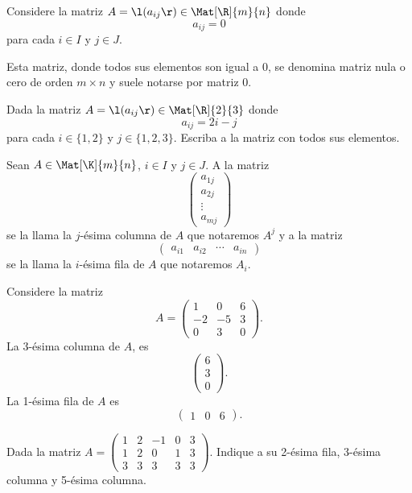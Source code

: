 \documentclass[compacto,10pt]{pubciencias-notas}
\begin{document}
\begin{ejem} \hspace{0pt} Considere la matriz $A = \l(a_{ij}\r)\in\Mat[\R]{m}{n}$ donde
\[
    a_{ij} = 0
\]
para cada $i\in I$ y $j\in J$. 

Esta matriz, donde todos sus elementos son igual a 0, se denomina matriz nula o cero de orden $m\times n$ y suele notarse por matriz $0$.  
    
\end{ejem}

\begin{ejer}\hspace{0pt} Dada la matriz $A = \l(a_{ij}\r)\in\Mat[\R]{2}{3}$ donde
\[
    a_{ij} = 2i - j
\]
para cada $i\in\{1,2\}$ y $j\in\{1,2,3\}$. Escriba a la matriz con todos sus elementos.
\end{ejer}

\begin{defi}
    Sean $A\in\Mat[\K]{m}{n}$, $i\in I$ y $j\in J$. A la matriz
    \[
        \begin{pmatrix}
        a_{1j} \\ 
        a_{2j} \\ 
        \vdots \\ 
        a_{mj} 
        \end{pmatrix}
    \]
    se la llama la $j$-ésima columna de $A$ que notaremos $A^j$ y a la matriz
    \[
        \begin{pmatrix}
        a_{i1}& a_{i2}&\cdots& a_{in}
        \end{pmatrix}
    \]
    se la llama la $i$-ésima fila de $A$ que notaremos $A_i$.
\end{defi}

\begin{ejem}
Considere la matriz
\[
    A = \begin{pmatrix}1&0&6\\-2&-5&3\\0&3&0\end{pmatrix}.
\]
La 3-ésima columna de $A$, es
\[
    \begin{pmatrix}6\\3\\0\end{pmatrix}.
\]
La 1-ésima fila de $A$ es
\[
    \begin{pmatrix}1&0&6\end{pmatrix}.
\]
\end{ejem}

\begin{ejer}\hspace{0pt} Dada la matriz $A = \begin{pmatrix}1&2&-1&0&3\\1&2&0&1&3\\3&3&3&3&3\end{pmatrix}$. Indique a su 2-ésima fila, 3-ésima columna y 5-ésima columna.
\end{ejer}
\end{document}
